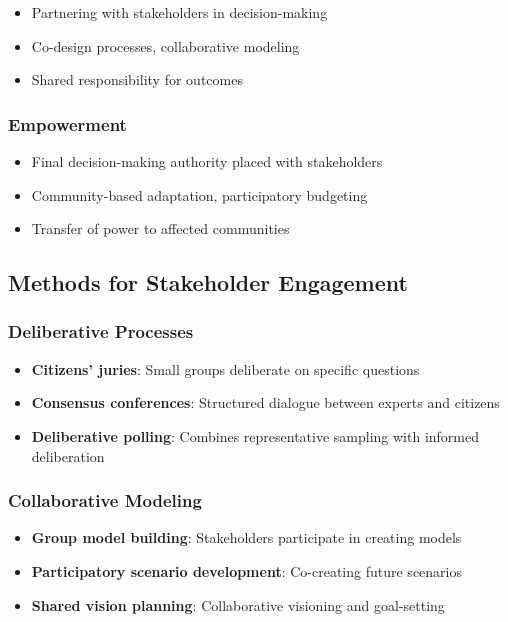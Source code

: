 \documentclass[
  letterpaper,
  DIV=11,
  numbers=noendperiod]{scrreprt}
\providecommand{\tightlist}{%
  \setlength{\itemsep}{0pt}\setlength{\parskip}{0pt}}
\begin{document}
\begin{itemize}
\tightlist
\item
  Partnering with stakeholders in decision-making
\item
  Co-design processes, collaborative modeling
\item
  Shared responsibility for outcomes
\end{itemize}

\subsubsection{Empowerment}\label{empowerment}

\begin{itemize}
\tightlist
\item
  Final decision-making authority placed with stakeholders
\item
  Community-based adaptation, participatory budgeting
\item
  Transfer of power to affected communities
\end{itemize}

\subsection{Methods for Stakeholder
Engagement}\label{methods-for-stakeholder-engagement}

\subsubsection{Deliberative Processes}\label{deliberative-processes}

\begin{itemize}
\tightlist
\item
  \textbf{Citizens' juries}: Small groups deliberate on specific
  questions
\item
  \textbf{Consensus conferences}: Structured dialogue between experts
  and citizens
\item
  \textbf{Deliberative polling}: Combines representative sampling with
  informed deliberation
\end{itemize}

\subsubsection{Collaborative Modeling}\label{collaborative-modeling}

\begin{itemize}
\tightlist
\item
  \textbf{Group model building}: Stakeholders participate in creating
  models
\item
  \textbf{Participatory scenario development}: Co-creating future
  scenarios
\item
  \textbf{Shared vision planning}: Collaborative visioning and
  goal-setting
\end{itemize}
\end{document}
